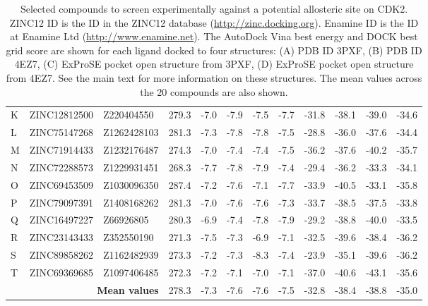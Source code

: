 \begin{table}
\begin{footnotesize}
\begin{tabular}{ p{2cm} l l p{2.5cm} l l l l l l l l }
K & ZINC12812500 & Z220404550  & 279.3 & -7.0 & -7.9 & -7.5 & -7.7 & -31.8 & -38.1 & -39.0 & -34.6 \\
L & ZINC75147268 & Z1262428103 & 281.3 & -7.3 & -7.8 & -7.8 & -7.5 & -28.8 & -36.0 & -37.6 & -34.4 \\
M & ZINC71914433 & Z1232176487 & 274.3 & -7.0 & -7.4 & -7.4 & -7.5 & -36.2 & -37.6 & -40.2 & -35.7 \\
N & ZINC72288573 & Z1229931451 & 268.3 & -7.7 & -7.8 & -7.9 & -7.4 & -29.4 & -36.2 & -33.3 & -34.1 \\
O & ZINC69453509 & Z1030096350 & 287.4 & -7.2 & -7.6 & -7.1 & -7.7 & -33.9 & -40.5 & -33.1 & -35.8 \\
P & ZINC79097391 & Z1408168262 & 281.3 & -7.0 & -7.6 & -7.6 & -7.3 & -33.7 & -38.5 & -37.5 & -33.8 \\
Q & ZINC16497227 & Z66926805   & 280.3 & -6.9 & -7.4 & -7.8 & -7.9 & -29.2 & -38.8 & -40.0 & -33.5 \\
R & ZINC23143433 & Z352550190  & 271.3 & -7.5 & -7.3 & -6.9 & -7.1 & -32.5 & -39.6 & -38.4 & -36.2 \\
S & ZINC89858262 & Z1162482939 & 273.3 & -7.2 & -7.3 & -8.3 & -7.4 & -23.9 & -35.1 & -39.6 & -36.2 \\
T & ZINC69369685 & Z1097406485 & 272.3 & -7.2 & -7.1 & -7.0 & -7.1 & -37.0 & -40.6 & -43.1 & -35.6 \\
\hline
\multicolumn{3}{r}{\textbf{Mean values}} & 278.3 & -7.3 & -7.6 & -7.6 & -7.5 & -32.8 & -38.4 & -38.8 & -35.0 \\
\hline
\end{tabular}
\end{footnotesize}

\caption[Selected compounds to screen experimentally against a potential allosteric site on CDK2]
{Selected compounds to screen experimentally against a potential allosteric site on CDK2.
ZINC12 ID is the ID in the ZINC12 database (\url{http://zinc.docking.org}).
Enamine ID is the ID at Enamine Ltd (\url{http://www.enamine.net}).
The AutoDock Vina best energy and DOCK best grid score are shown for each ligand docked to four structures:
(A) PDB ID 3PXF,
(B) PDB ID 4EZ7,
(C) ExProSE pocket open structure from 3PXF,
(D) ExProSE pocket open structure from 4EZ7.
See the main text for more information on these structures.
The mean values across the 20 compounds are also shown.}

\label{tab:enamine_compounds}
\end{table}


